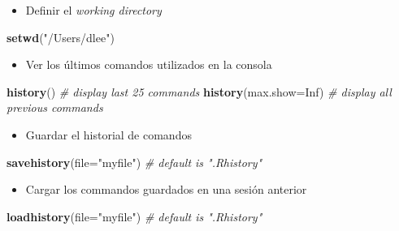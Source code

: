 \documentclass[]{article}
\def\tightlist{}
\newenvironment{Shaded}{\begin{snugshade}}{\end{snugshade}}
\newcommand{\KeywordTok}[1]{\textcolor[rgb]{0.13,0.29,0.53}{\textbf{{#1}}}}
\newcommand{\DataTypeTok}[1]{\textcolor[rgb]{0.13,0.29,0.53}{{#1}}}
\newcommand{\StringTok}[1]{\textcolor[rgb]{0.31,0.60,0.02}{{#1}}}
\newcommand{\CommentTok}[1]{\textcolor[rgb]{0.56,0.35,0.01}{\textit{{#1}}}}
\newcommand{\OtherTok}[1]{\textcolor[rgb]{0.56,0.35,0.01}{{#1}}}
\newcommand{\NormalTok}[1]{{#1}}
\numberwithin{equation}{section}
\begin{document}
\begin{itemize}
\tightlist
\item
  Definir el \emph{working directory}
\end{itemize}

\begin{Shaded}
\begin{Highlighting}[]
\KeywordTok{setwd}\NormalTok{(}\StringTok{"/Users/dlee"}\NormalTok{) }
\end{Highlighting}
\end{Shaded}

\begin{itemize}
\tightlist
\item
  Ver los últimos comandos utilizados en la consola
\end{itemize}

\begin{Shaded}
\begin{Highlighting}[]
\KeywordTok{history}\NormalTok{() }\CommentTok{# display last 25 commands}
\KeywordTok{history}\NormalTok{(}\DataTypeTok{max.show=}\OtherTok{Inf}\NormalTok{) }\CommentTok{# display all previous commands}
\end{Highlighting}
\end{Shaded}

\begin{itemize}
\tightlist
\item
  Guardar el historial de comandos
\end{itemize}

\begin{Shaded}
\begin{Highlighting}[]
\KeywordTok{savehistory}\NormalTok{(}\DataTypeTok{file=}\StringTok{"myfile"}\NormalTok{) }\CommentTok{# default is ".Rhistory"}
\end{Highlighting}
\end{Shaded}

\begin{itemize}
\tightlist
\item
  Cargar los commandos guardados en una sesión anterior
\end{itemize}

\begin{Shaded}
\begin{Highlighting}[]
\KeywordTok{loadhistory}\NormalTok{(}\DataTypeTok{file=}\StringTok{"myfile"}\NormalTok{) }\CommentTok{# default is ".Rhistory"}
\end{Highlighting}
\end{Shaded}
\end{document}
